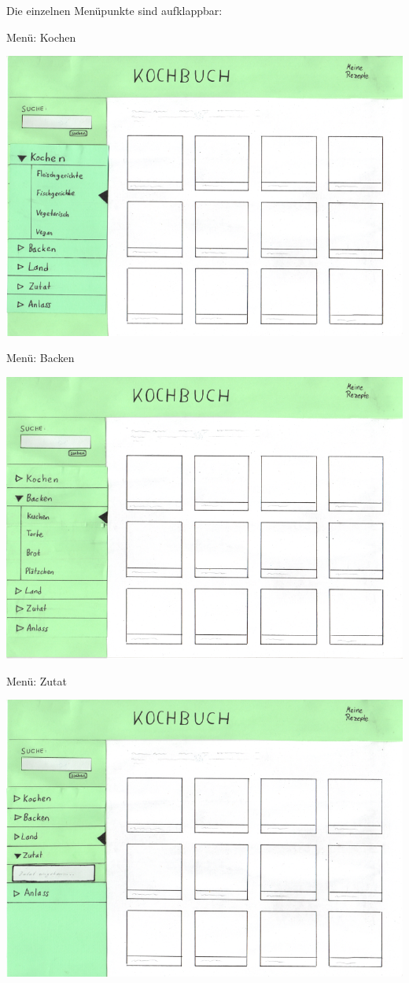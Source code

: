 \documentclass[parskip,10pt,abstracton]{scrartcl}
\begin{document}
Die einzelnen Menüpunkte sind aufklappbar:

Menü: Kochen
\begin{center}
\includegraphics[scale=0.4]{Prototyp/menu_kochen.png}
\end{center}

Menü: Backen
\begin{center}
\includegraphics[scale=0.4]{Prototyp/menu_backen.png}
\end{center}

Menü: Zutat
\begin{center}
\includegraphics[scale=0.4]{Prototyp/menu_zutat.png}
\end{center}
\end{document}
